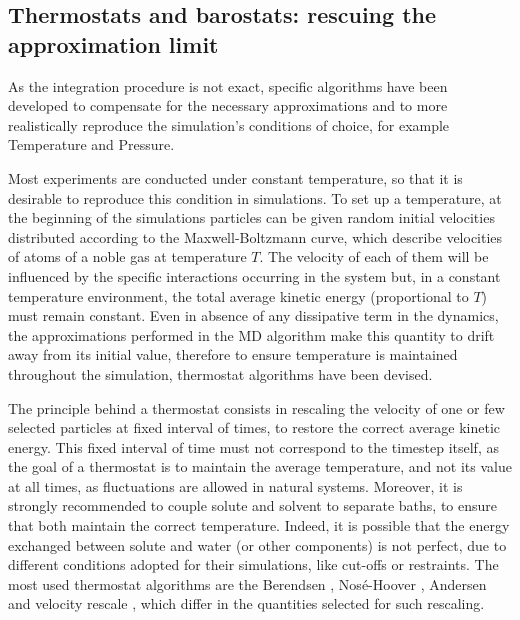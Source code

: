 \documentclass[graybox]{svmult}
\begin{document}
\subsection{Thermostats and barostats: rescuing the approximation limit}
As the integration procedure is not exact, specific algorithms have been developed to compensate for the necessary approximations and to more realistically reproduce the simulation's conditions of choice, for example Temperature and Pressure.

Most experiments are conducted under constant temperature, so that it is desirable to reproduce this condition in simulations.
%
To set up a temperature, at the beginning of the simulations particles can be given random initial velocities distributed according to the Maxwell-Boltzmann curve, which describe velocities of atoms of a noble gas at temperature $T$. The velocity of each of them will be influenced by the specific interactions occurring in the system but, in a constant temperature environment, the total average kinetic energy (proportional to $T$) must remain constant.
%
Even in absence of any dissipative term in the dynamics, the approximations performed in the MD algorithm make this quantity to drift away from its initial value, therefore to ensure temperature is maintained throughout the simulation, thermostat algorithms have been devised.

The principle behind a thermostat consists in rescaling the velocity of one or few selected particles at fixed interval of times, to restore the correct average kinetic energy. This fixed interval of time must not correspond to the timestep itself, as the goal of a thermostat is to maintain the average temperature, and not its value at all times, as fluctuations are allowed in natural systems.
%
Moreover, it is strongly recommended to couple solute and solvent to separate baths, to ensure that both maintain the correct temperature. Indeed, it is possible that the energy exchanged between solute and water (or other components) is not perfect, due to different conditions adopted for their simulations, like cut-offs or restraints.
%
The most used thermostat algorithms are the Berendsen \cite{Berendsen1984}, Nos\'{e}-Hoover \cite{Nose1983,Hoover1985}, Andersen \cite{Andersen1980} and velocity rescale \cite{Bussi2007}, which differ in the quantities selected for such rescaling.
\end{document}
